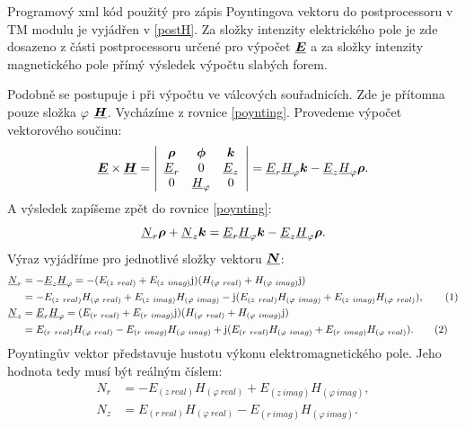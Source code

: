\documentclass[12pt,a4paper,oneside]{article}
\numberwithin{equation}{section} %
\numberwithin{figure}{section} %
\numberwithin{table}{section} %
\newcommand{\mj}{\mathrm{j}} %
\renewcommand{\vec}[1]{\mbox{\boldmath$#1$}} %
\newcommand{\faz}[1]{{\underline{#1}}} %
\newcommand\numberthis{\addtocounter{equation}{1}\tag{\theequation}}
\begin{document}
Programový xml kód použitý pro zápis Poyntingova vektoru do postprocessoru v TM modulu je vyjádřen v \ref{postH}. Za složky intenzity elektrického pole je zde dosazeno z části postprocessoru určené pro výpočet $\faz{\vec{E}}$ a za složky intenzity magnetického pole přímý výsledek výpočtu slabých forem.


Podobně se postupuje i při výpočtu ve válcových souřadnicích. Zde je přítomna pouze složka $\varphi$ $\faz{\vec{H}}$. Vycházíme z rovnice \ref{poynting}. Provedeme výpočet vektorového součinu:
\begin{equation}
\faz{\vec{E}} \times \faz{\vec{H}} =
\left| 
\begin{array}{c c c}
\vec{\rho} & \vec{\phi} & \vec{k} \\ 
\faz{E} _r & 0 & \faz{E} _z \\
0 & \faz{H} _{\varphi} & 0
\end{array}
\right|
= \faz{E} _r \faz{H} _{\varphi} \vec{k} - \faz{E} _z \faz{H} _{\varphi} \vec{\rho} .
\end{equation}
A výsledek zapíšeme zpět do rovnice \ref{poynting}:
\begin{equation}
\faz{N} _r \vec{\rho} + \faz{N} _z \vec{k} = \faz{E} _r \faz{H} _{\varphi} \vec{k} - \faz{E} _z \faz{H} _{\varphi} \vec{\rho} .
\end{equation}
Výraz vyjádříme pro jednotlivé složky vektoru $\faz{\vec{N}}$:
\begin{subequations}
\begin{align*}
\faz{N} _r &= - \faz{E} _z \faz{H} _{\varphi} = - (E _{(z~real)} + E _{(z~imag)} \mj) (H _{(\varphi ~real)} + H _{(\varphi ~imag)} \mj) 
\\
&= - E _{(z~real)} H _{(\varphi ~real)} + E _{(z~imag)} H _{(\varphi ~imag)} - \mj (E _{(z~real)} H _{(\varphi ~imag)} + E _{(z~imag)} H _{(\varphi ~real)}) ,
\numberthis
\\
\faz{N} _z &= \faz{E} _r \faz{H} _{\varphi} = (E _{(r~real)} + E _{(r~imag)} \mj) (H _{(\varphi ~real)} + H _{(\varphi ~imag)} \mj)
\\ 
&= E _{(r~real)} H _{(\varphi ~real)} - E _{(r~imag)} H _{(\varphi ~imag)} + \mj (E _{(r~real)} H _{(\varphi ~imag)} + E _{(r~imag)} H _{(\varphi ~real)}) .
\numberthis
\end{align*}
\end{subequations}
Poyntingův vektor představuje hustotu výkonu elektromagnetického pole. Jeho hodnota tedy musí být reálným číslem:
\begin{subequations}
\begin{align}
N _r &= - E _{(z~real)} H _{(\varphi ~real)} + E _{(z~imag)} H _{(\varphi ~imag)} ,
\\
N _z &= E _{(r~real)} H _{(\varphi ~real)} - E _{(r~imag)} H _{(\varphi ~imag)} .
\end{align}
\end{subequations}
\end{document}
